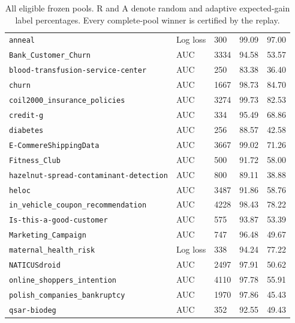 \begin{table}[!htbp]
\centering\small{}\setlength{\tabcolsep}{3.5pt}\renewcommand{\arraystretch}{1.04}
\caption{All eligible frozen pools. R and A denote random and adaptive expected-gain label percentages. Every complete-pool winner is certified by the replay.}
\label{tab:disclosuretasks}
\begin{tabularx}{\textwidth}{@{}XL{0.15\textwidth}N{0.12\textwidth}N{0.12\textwidth}N{0.12\textwidth}@{}}
\toprule
{} &  &  &  & \\\midrule
\nolinkurl{anneal} & Log loss & 300 & 99.09 & 97.00\\
\nolinkurl{Bank_Customer_Churn} & AUC & 3334 & 94.58 & 53.57\\
\nolinkurl{blood-transfusion-service-center} & AUC & 250 & 83.38 & 36.40\\
\nolinkurl{churn} & AUC & 1667 & 98.73 & 84.70\\
\nolinkurl{coil2000_insurance_policies} & AUC & 3274 & 99.73 & 82.53\\
\nolinkurl{credit-g} & AUC & 334 & 95.49 & 68.86\\
\nolinkurl{diabetes} & AUC & 256 & 88.57 & 42.58\\
\nolinkurl{E-CommereShippingData} & AUC & 3667 & 99.02 & 71.26\\
\nolinkurl{Fitness_Club} & AUC & 500 & 91.72 & 58.00\\
\nolinkurl{hazelnut-spread-contaminant-detection} & AUC & 800 & 89.11 & 38.88\\
\nolinkurl{heloc} & AUC & 3487 & 91.86 & 58.76\\
\nolinkurl{in_vehicle_coupon_recommendation} & AUC & 4228 & 98.43 & 78.22\\
\nolinkurl{Is-this-a-good-customer} & AUC & 575 & 93.87 & 53.39\\
\nolinkurl{Marketing_Campaign} & AUC & 747 & 96.48 & 49.67\\
\nolinkurl{maternal_health_risk} & Log loss & 338 & 94.24 & 77.22\\
\nolinkurl{NATICUSdroid} & AUC & 2497 & 97.91 & 50.62\\
\nolinkurl{online_shoppers_intention} & AUC & 4110 & 97.78 & 55.91\\
\nolinkurl{polish_companies_bankruptcy} & AUC & 1970 & 97.86 & 45.43\\
\nolinkurl{qsar-biodeg} & AUC & 352 & 92.55 & 49.43\\

\end{tabularx}
\end{table}
